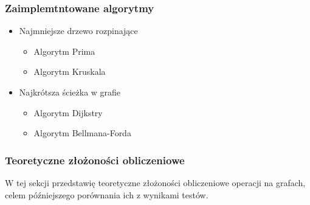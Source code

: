 \documentclass{article}
\begin{document}
        \subsubsection{Zaimplemtntowane algorytmy}
            \begin{itemize}
                \item Najmniejsze drzewo rozpinające
                \begin{itemize}
                    \item Algorytm Prima
                    \item Algorytm Kruskala
                \end{itemize}
                \item Najkrótsza ścieżka w grafie
                \begin{itemize}
                    \item Algorytm Dijkstry
                    \item Algorytm Bellmana-Forda
                \end{itemize}
            \end{itemize}

    \subsubsection{Teoretyczne złożoności obliczeniowe}
    W tej sekcji przedstawię teoretyczne złożoności obliczeniowe operacji na grafach, celem późniejszego porównania ich z wynikami testów.
\end{document}
